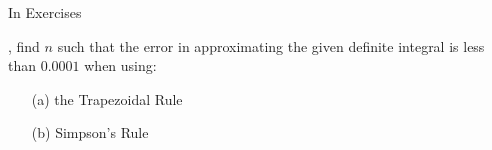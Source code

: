 {\noindent In Exercises}
{, find $n$ such that the error in approximating the given definite integral is less than $0.0001$ when using:
\begin{enumerate}
\item [(a)] the Trapezoidal Rule
\item [(b)] Simpson's Rule
\end{enumerate}
}
